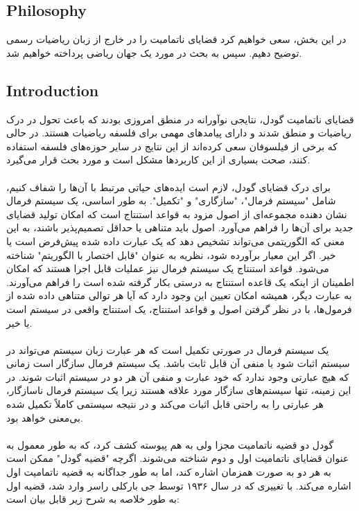 \documentclass[10pt,a4paper]{article}
\begin{document}
                \subsection{Philosophy}
در این بخش، سعی خواهیم کرد قضایای ناتمامیت را در خارج از زبان ریاضیات رسمی توضیح دهیم. سپس به بحث در مورد یک جهان ریاضی پرداخته خواهیم شد.
                        \subsection{Introduction}
قضایای ناتمامیت گودل، نتایجی نوآورانه در منطق امروزی بودند که باعث تحول در درک ریاضیات و منطق شدند و دارای پیامدهای مهمی برای فلسفه ریاضیات هستند. در حالی که برخی از فیلسوفان سعی کرده‌اند از این نتایج در سایر حوزه‌های فلسفه استفاده کنند، صحت بسیاری از این کاربردها مشکل است و مورد بحث قرار می‌گیرد.
                            \\
                            \\
برای درک قضایای گودل، لازم است ایده‌های حیاتی مرتبط با آن‌ها را شفاف کنیم، شامل "سیستم فرمال"، "سازگاری" و "تکمیل". به طور اساسی، یک سیستم فرمال نشان دهنده مجموعه‌ای از اصول مزود به قواعد استنتاج است که امکان تولید قضایای جدید برای آن‌ها را فراهم می‌آورد. اصول باید متناهی یا حداقل تصمیم‌پذیر باشند، به این معنی که الگوریتمی می‌تواند تشخیص دهد که یک عبارت داده شده پیش‌فرض است یا خیر. اگر این معیار برآورده شود، نظریه به عنوان "قابل اختصار با الگوریتم" شناخته می‌شود. قواعد استنتاج یک سیستم فرمال نیز عملیات قابل اجرا هستند که امکان اطمینان از اینکه یک قاعده استنتاج به درستی بکار گرفته شده است را فراهم می‌آورند. به عبارت دیگر، همیشه امکان تعیین این وجود دارد که آیا هر توالی متناهی داده شده از فرمول‌ها، با در نظر گرفتن اصول و قواعد استنتاج، یک استنتاج واقعی در سیستم است یا خیر.
                            \\
                            \\
یک سیستم فرمال در صورتی تکمیل است که هر عبارت زبان سیستم می‌تواند در سیستم اثبات شود یا منفی آن قابل ثابت باشد. یک سیستم فرمال سازگار است زمانی که هیچ عبارتی وجود ندارد که خود عبارت و منفی آن هر دو در سیستم اثبات شوند. در این زمینه، تنها سیستم‌های سازگار مورد علاقه هستند زیرا یک سیستم فرمال ناسازگار، هر عبارتی را به راحتی قابل اثبات می‌کند و در نتیجه سیستمی کاملاً تکمیل شده بی‌معنی خواهد بود.
                            \\
                            \\
گودل دو قضیه ناتمامیت مجزا ولی به هم پیوسته کشف کرد، که به طور معمول به عنوان قضایای ناتمامیت اول و دوم شناخته می‌شوند. اگرچه "قضیه گودل" ممکن است به هر دو به صورت همزمان اشاره کند، اما به طور جداگانه به قضیه ناتمامیت اول اشاره می‌کند. با تغییری که در سال ۱۹۳۶ توسط جی بارکلی راسر وارد شد، قضیه اول به طور خلاصه به شرح زیر قابل بیان است:
\end{document}
